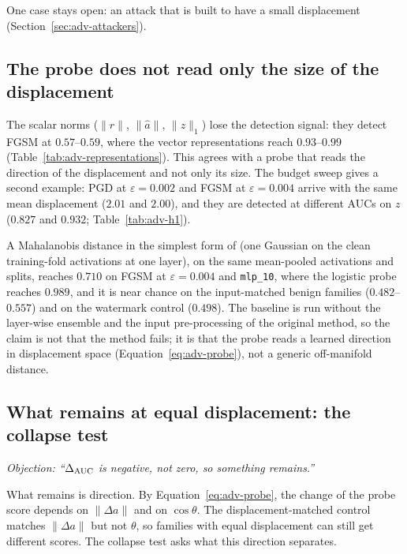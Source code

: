 \documentclass[../ppgc-tese.tex]{subfiles}
\begin{document}
One case stays open: an attack that is built to have a small displacement
(Section~\ref{sec:adv-attackers}).

\subsection{The probe does not read only the size of the displacement}
\label{sec:adv-not-size}
The scalar norms ($\lVert r\rVert$, $\lVert\hat{a}\rVert$, $\lVert z\rVert_1$)
lose the detection signal: they detect FGSM at $0.57$--$0.59$, where the
vector representations reach $0.93$--$0.99$
(Table~\ref{tab:adv-representations}). This agrees with a probe that reads the
direction of the displacement and not only its size.
The budget sweep gives a second example: PGD at $\varepsilon{=}0.002$ and FGSM
at $\varepsilon{=}0.004$ arrive with the same mean displacement ($2.01$ and
$2.00$), and they are detected at different AUCs on $z$ ($0.827$ and $0.932$;
Table~\ref{tab:adv-h1}).

A Mahalanobis distance in the simplest form of 
(one Gaussian on the clean training-fold activations at one layer), on the
same mean-pooled activations and splits, reaches $0.710$ on FGSM at
$\varepsilon{=}0.004$ and \texttt{mlp\_10}, where the logistic probe reaches
$0.989$, and it is near chance on the input-matched benign families
($0.482$--$0.557$) and on the watermark control ($0.498$).
The baseline is run without the layer-wise ensemble and the input
pre-processing of the original method, so the claim is not that the method
fails; it is that the probe reads a learned direction in displacement space
(Equation~\eqref{eq:adv-probe}), not a generic off-manifold distance.

\subsection{What remains at equal displacement: the collapse test}
\label{sec:adv-collapse}
\emph{Objection: ``$\Delta_{\mathrm{AUC}}$ is negative, not zero, so something remains.''}

What remains is direction. By Equation~\eqref{eq:adv-probe}, the change of
the probe score depends on $\lVert\Delta a\rVert$ and on $\cos\theta$. The
displacement-matched control matches $\lVert\Delta a\rVert$ but not $\theta$,
so families with equal displacement can still get different scores. The
collapse test asks what this direction separates.
\end{document}
